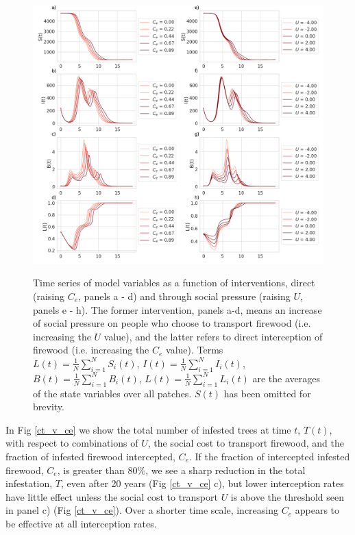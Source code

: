  \begin{figure}[!h]
\includegraphics[width = \textwidth]{chapter_2/timeseries.png}
\caption[Time series of model variables as a function of interventions, direct (raising $C_e$, panels a - d) and through social pressure (raising $U$, panels e - h).]{Time series of model variables as a function of interventions, direct (raising $C_e$, panels a - d) and through social pressure (raising $U$, panels e - h). The former intervention, panels a-d, means an increase of social pressure on people who choose to transport firewood (i.e. increasing the $U$ value), and the latter refers to direct interception of firewood (i.e. increasing the $C_e$ value). Terms $L(t) = \frac{1}{N} \sum_{i = 1}^N S_i(t)$, $I(t) = \frac{1}{N} \sum_{i = 1}^N I_i(t)$, $B(t) = \frac{1}{N} \sum_{i = 1}^N B_i(t)$, $L(t) = \frac{1}{N} \sum_{i = 1}^N L_i(t)$ are the averages of the state variables over all patches. $S(t)$ has been omitted for brevity.}
\protect \label{ts}
\end{figure}

In Fig \ref{ct_v_ce} we show the total number of infested trees at time $t$, $T(t)$, with respect to combinations of $U$, the social cost to transport firewood, and the fraction of infested firewood intercepted, $C_e$. If the fraction of intercepted infested firewood, $C_e$, is greater than 80\%, we see a sharp reduction in the total infestation, $T$, even after 20 years (Fig \ref{ct_v_ce} c), but lower interception rates have little effect unless the social cost to transport $U$ is above the threshold seen in panel c) (Fig \ref{ct_v_ce}). Over a shorter time scale, increasing $C_e$ appears to be effective at all interception rates. 


